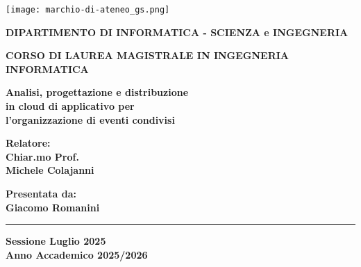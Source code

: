 
\begin{titlepage}
    
\pagestyle{empty}


\begin{center}

\texttt{[image: marchio-di-ateneo\_gs.png]}

\vspace{10mm}

{\normalsize{\bf{DIPARTIMENTO DI INFORMATICA - SCIENZA e INGEGNERIA}}} 

\vspace{5mm}

{\large{\bf{CORSO DI LAUREA MAGISTRALE IN INGEGNERIA INFORMATICA}}}
\end{center}
\vspace{23mm}
\begin{adjustwidth}{10mm}{10mm}
\begin{center}

{\Huge{\bf Analisi, progettazione e distribuzione}}\\
\vspace{3mm}
{\Huge{\bf in cloud di applicativo per}}\\
\vspace{3mm}
{\Huge{\bf l'organizzazione di eventi condivisi}}\\
\vspace{3mm}

\end{center}
\end{adjustwidth}

\vspace{35mm}

\begin{minipage}[t]{0.40\textwidth}
{\Large{\bf Relatore: \\ Chiar.mo Prof.\\ Michele Colajanni}}

\vspace{3mm}

{\Large{\bf }}
\end{minipage}
\hfill
\begin{minipage}[t]{0.40\textwidth}\raggedleft
{\Large{\bf Presentata da: \\ Giacomo Romanini}}
\end{minipage}

\vspace{10mm}

\rule[0.5cm]{15.8cm}{0.6mm}

\begin{center}
{\large{\bf Sessione Luglio 2025 \\}}
{\large{\bf Anno Accademico 2025/2026\\}}
\end{center}

\end{titlepage}

\restoregeometry
\clearpage